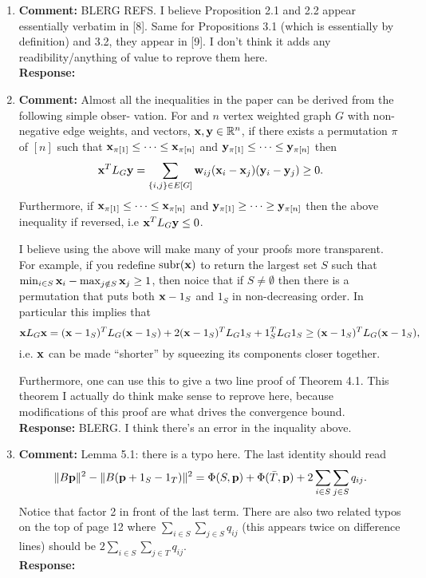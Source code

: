\documentclass[a4paper,10pt]{article}
\begin{document}
\begin{enumerate}

\item\textbf{Comment:} 
BLERG REFS.  I believe Proposition 2.1 and 2.2 appear essentially verbatim in [8]. Same for Propositions
3.1 (which is essentially by definition) and 3.2, they appear in [9]. I don’t think it adds any
readibility/anything of value to reprove them here.
\\\textbf{Response:}

\newcommand{\rng}{\operatorname{rng}}
\newcommand{\subrng}{\operatorname{subr}}
\newcommand{\decrng}{\operatorname{decrng}}

\item\textbf{Comment:} 
Almost all the inequalities in the paper can be derived from the following simple obser-
vation.  For and $n$ vertex weighted graph $G$ with non-negative edge weights, and vectors, $\mathbf{x},\mathbf{y} \in {\mathbb R}^n$, if there exists a permutation $\pi$ of $[n]$ such that $\mathbf{x}_{\pi[1]} \leq \dots \leq \mathbf{x}_{\pi[n]}$ and $\mathbf{y}_{\pi[1]} \leq \dots \leq \mathbf{y}_{\pi[n]}$ then
\[
\mathbf{x}^T L_G \mathbf{y} = \sum_{ \{i,j\} \in E[G] } \mathbf{w}_{ij} (\mathbf{x}_{i} - \mathbf{x}_{j}) (\mathbf{y}_{i} - \mathbf{y}_{j}) \geq 0.
\]
Furthermore, if $\mathbf{x}_{\pi[1]} \leq \dots \leq \mathbf{x}_{\pi[n]}$ and $\mathbf{y}_{\pi[1]} \geq \dots \geq \mathbf{y}_{\pi[n]}$ then the above inequality if reversed, i.e $\mathbf{x}^T L_G \mathbf{y} \leq 0$. 

I believe using the above will make many of your proofs more transparent.  For example, if you redefine $\subrng(\xbf)$ to return the largest set $S$ such that $\min_{i\in S} \mathbf{x}_i - \max_{j \notin S} \mathbf{x}_j \geq 1$, then noice that if $S \neq \emptyset$ then there is a permutation that puts both $\mathbf{x} - 1_S$ and $1_S$ in non-decreasing order. In particular this implies that
\[
\mathbf{x} L_G \mathbf{x} = (\mathbf{x} - 1_S)^T L_G (\mathbf{x} - 1_S) + 2(\mathbf{x} - 1_S)^T L_G 1_S + 1_S^T L_G 1_S \geq (\mathbf{x} - 1_S)^T L_G (\mathbf{x} - 1_S),
\]
i.e. $\mathbf{x}$ can be made ``shorter'' by squeezing its components closer together.

Furthermore, one can use this to give a two line proof of Theorem 4.1.  This theorem I actually do think make sense to reprove here, because modifications of this proof are what drives the convergence bound. 
\\\textbf{Response:}
BLERG.  I think there's an error in the inquality above.

\item\textbf{Comment:} 
Lemma 5.1: there is a typo here.  The last identity should read
\[
\|B\mathbf{p}\|^2 - \|B(\mathbf{p} + 1_S - 1_T)\|^2 = \Phi(S,\mathbf{p}) + \Phi(\bar{T}, \mathbf{p}) + 2\sum_{i \in S}\sum_{j\in S} q_{ij}.
\]
Notice that factor 2 in front of the last term.  There are also two related typos on the top of page 12 where $\sum_{i \in S}\sum_{j\in S} q_{ij}$ (this appears twice on difference lines) should be $2\sum_{i \in S}\sum_{j\in T} q_{ij}$.
\\\textbf{Response:}



\end{enumerate}
\end{document}
